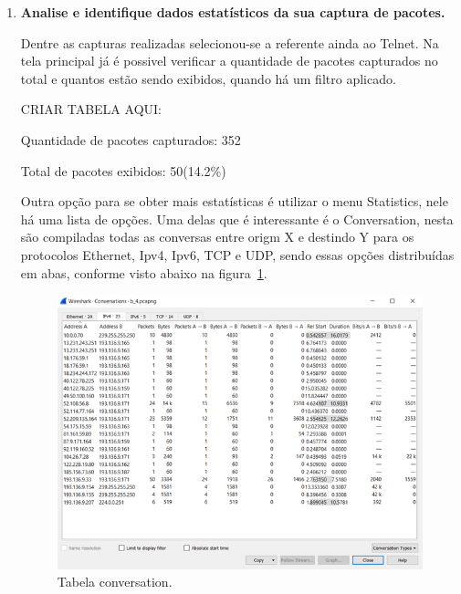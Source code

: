 \documentclass{llncs}
\begin{document}
  \begin{enumerate}[\textbf{d)}]
    \item \textbf{Analise e identifique dados estatísticos da sua captura de pacotes.}

    \begin{flushleft}
      Dentre as capturas realizadas selecionou-se a referente ainda ao Telnet. Na tela principal já é possivel verificar a quantidade de pacotes capturados no total e quantos estão sendo exibidos, quando há um filtro aplicado.
      \par CRIAR TABELA AQUI:
      \par Quantidade de pacotes capturados: 352
      \par Total de pacotes exibidos: 50(14.2\%)
      \par Outra opção para se obter mais estatísticas é utilizar o menu Statistics, nele há uma lista de opções. Uma delas que é interessante é o Conversation, nesta são compiladas todas as conversas entre origm X e destindo Y para os protocolos Ethernet, Ipv4, Ipv6, TCP e UDP, sendo essas opções distribuídas em abas, conforme visto abaixo na figura~\ref{fig:conversation01}.
      \begin{figure}[h]
        \includegraphics[scale=0.65]{conversation01.png}
        \centering
        \caption{Tabela conversation.}
        \label{fig:conversation01}
      \end{figure}
    \end{flushleft}


\end{enumerate}
\end{document}
